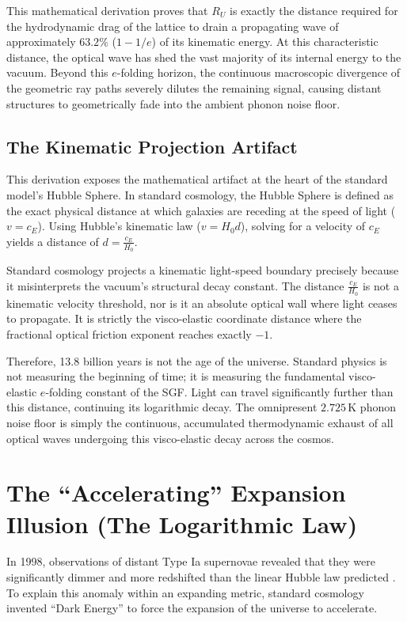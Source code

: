 This mathematical derivation proves that $R_U$ is exactly the distance required for the hydrodynamic drag of the lattice to drain a propagating wave of approximately $63.2\%$ ($1 - 1/e$) of its kinematic energy. At this characteristic distance, the optical wave has shed the vast majority of its internal energy to the vacuum. Beyond this $e$-folding horizon, the continuous macroscopic divergence of the geometric ray paths severely dilutes the remaining signal, causing distant structures to geometrically fade into the ambient phonon noise floor.

\subsection{The Kinematic Projection Artifact}
\label{sec:kinematic_projection_artifact}

This derivation exposes the mathematical artifact at the heart of the standard model's Hubble Sphere. In standard cosmology, the Hubble Sphere is defined as the exact physical distance at which galaxies are receding at the speed of light ($v = c_E$). Using Hubble's kinematic law ($v = H_0 d$), solving for a velocity of $c_E$ yields a distance of $d = \frac{c_E}{H_0}$.

Standard cosmology projects a kinematic light-speed boundary precisely because it misinterprets the vacuum's structural decay constant. The distance $\frac{c_E}{H_0}$ is not a kinematic velocity threshold, nor is it an absolute optical wall where light ceases to propagate. It is strictly the visco-elastic coordinate distance where the fractional optical friction exponent reaches exactly $-1$.

Therefore, 13.8 billion years is not the age of the universe. Standard physics is not measuring the beginning of time; it is measuring the fundamental visco-elastic $e$-folding constant of the SGF. Light can travel significantly further than this distance, continuing its logarithmic decay. The omnipresent $2.725\,\text{K}$ phonon noise floor is simply the continuous, accumulated thermodynamic exhaust of all optical waves undergoing this visco-elastic decay across the cosmos.

\section{The ``Accelerating'' Expansion Illusion (The Logarithmic Law)}
In 1998, observations of distant Type Ia supernovae revealed that they were significantly dimmer and more redshifted than the linear Hubble law predicted \cite{Riess_1998}. To explain this anomaly within an expanding metric, standard cosmology invented ``Dark Energy'' to force the expansion of the universe to accelerate.

